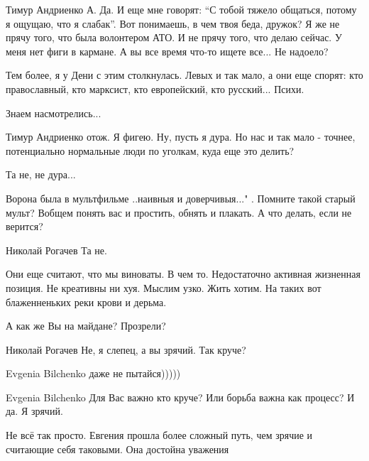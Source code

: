 \begin{itemize}

Тимур Андриенко А. Да. И еще мне говорят: \enquote{С тобой тяжело общаться, потому я
ощущаю, что я слабак}. Вот понимаешь, в чем твоя беда, дружок? Я же не прячу
того, что была волонтером АТО. И не прячу того, что делаю сейчас. У меня нет
фиги в кармане. А вы все время что-то ищете все... Не надоело?


Тем более, я у Дени с этим столкнулась. Левых и так мало, а они еще спорят: кто
православный, кто марксист, кто европейский, кто русский... Психи.


Знаем насмотрелись...


Тимур Андриенко отож. Я фигею. Ну, пусть я дура. Но нас и так мало - точнее,
потенциально нормальные люди по уголкам, куда еще это делить?


Та не, не дура...


Ворона была в мультфильме ..наивныя и доверчивыя..." . Помните такой старый
мульт? Вобщем понять вас и простить, обнять и плакать. А что делать, если не
верится?


Николай Рогачев Та не.

Они еще считают, что мы виноваты. В чем то. Недостаточно активная жизненная
позиция. Не креативны ни хуя. Мыслим узко. Жить хотим.  На таких вот
блаженненьких реки крови и дерьма.


А как же Вы на майдане? Прозрели?

Николай Рогачев Не, я слепец, а вы зрячий. Так круче?


Evgenia Bilchenko даже не пытайся)))))


Evgenia Bilchenko Для Вас важно кто круче? Или борьба важна как процесс? И да. Я зрячий.


Не всё так просто. Евгения прошла более сложный путь, чем зрячие и считающие себя таковыми. Она достойна уважения



\end{itemize}
